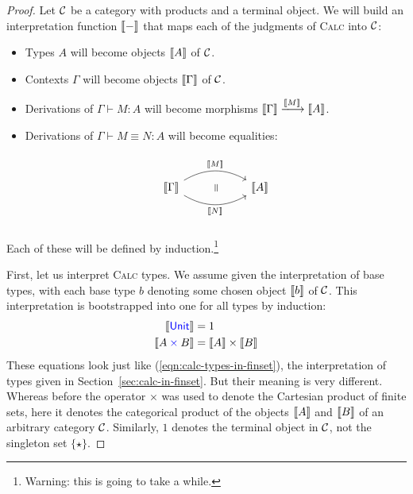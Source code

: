 \begin{proof}
  Let \(\mathcal C\) be a category with products and a terminal object.
  We will build an interpretation function \(\left\llbracket -\right\rrbracket\)
  that maps each of the judgments of \textsc{Calc}
  into \(\mathcal C\):
  \begin{itemize}
  \item Types \(A\) will become objects \(\left\llbracket A\right\rrbracket\) of \(\mathcal C\).
  \item Contexts \(\Gamma\) will become objects \(\left\llbracket \Gamma\right\rrbracket\) of \(\mathcal C\).
  \item Derivations of \(\Gamma \vdash M : A\) will become
    morphisms \(\llbr{\Gamma} \xlongrightarrow{\llbr{M}} \llbr{A}\).
  \item Derivations of \(\Gamma \vdash M \equiv N : A\) will become
    equalities:
    \[%
\begin{tikzcd}
                                                                                    & {} \arrow[dd, "~\rotatebox{90}{\(=\)}", phantom] &          \\
\llbr{\Gamma} \arrow[rr, "\llbr{M}", bend left] \arrow[rr, "\llbr{N}"', bend right] &                                                  & \llbr{A} \\
                                                                                    & {}                                               &
\end{tikzcd}\]
  \end{itemize}
  Each of these will be defined by induction.\footnote{
  Warning: this is going to take a while.
  }

  First, let us interpret \textsc{Calc} types.
  We assume given the interpretation of base types,
  with each base type \(b\) denoting some chosen object \(\left\llbracket b\right\rrbracket\) of \(\mathcal C\).
  This interpretation is bootstrapped into one for all types by induction:
  \begin{align}
    \left\llbracket \mathsf{{\color{blue}Unit}}\right\rrbracket &= 1 \\
    \left\llbracket A \mathbin{{\color{blue}\times}} B\right\rrbracket &= \left\llbracket A\right\rrbracket \times \left\llbracket B\right\rrbracket
  \end{align}
  These equations look just like
  (\ref{eqn:calc-types-in-finset}), the interpretation
  of types given in Section~\ref{sec:calc-in-finset}.
  But their meaning is very different.
  Whereas before the operator \(\times\) was used
  to denote the Cartesian product of finite sets,
  here it denotes the categorical
  product of the objects \(\left\llbracket A\right\rrbracket\) and \(\left\llbracket B\right\rrbracket\)
  of an arbitrary category \(\mathcal C\).
  Similarly, \(1\) denotes the terminal object in \(\mathcal C\),
  not the singleton set \(\{\star\}\).


\end{proof}
